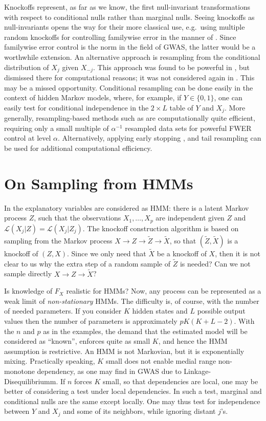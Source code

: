 \documentclass[article,lineno]{biometrika}
\begin{document}
	Knockoffs represent, as far as we know, the first null-invariant transformations with respect to conditional nulls rather than marginal nulls.
	Seeing knockoffs as null-invariants opens the way for their more classical use, e.g.\ using multiple random knockoffs for controlling familywise error in the manner of \cite{Westfall1993}. Since familywise error control is the norm in the field of GWAS, the latter would be a worthwhile extension. 
	An alternative approach is resampling from the conditional distribution of $X_j$ given $X_{-j}$. 
	This approach was found to be powerful in \cite[Fig.3]{CandesPanninggoldmodelX2018}, but dismissed there for computational reasons; it was not considered again in \cite{SesiaGenehuntinghidden}. 
	This may be a missed opportunity. 
	Conditional resampling can be done easily in the context of hidden Markov models, where, for example, if $Y\in \{0,1\}$, one can easily test for conditional independence in the $2\times L$ table of $Y$ and $X_j$. 
	More generally, resampling-based methods such as \cite{Westfall1993} are computationally quite efficient, requiring only a small multiple of $\alpha^{-1}$ resampled data sets for powerful FWER control at level $\alpha$. 
	Alternatively, applying early stopping \citep[e.g.][]{jiang2012statistical}, and tail resampling \cite[e.g.][]{yu2011efficient} can be used for additional computational efficiency.
		
	
	
	\section{On Sampling from HMMs}
	In \cite{SesiaGenehuntinghidden} the explanatory variables are considered as HMM: there is a latent Markov process $Z$, such that the observations $X_1,\dots,X_p$ are independent given $Z$ and ${\mathcal L}(X_j|Z)={\mathcal L}(X_j|Z_j)$.
	The knockoff construction algorithm is based on sampling from the Markov process $X\to Z\to \tilde Z\to \tilde X$, so that $(\tilde Z,\tilde X)$ is a knockoff of $(Z,X)$.
	Since we only need that $\tilde{X}$ be a knockoff of $X$, then it is not clear to us why the extra step of a random sample of $\tilde Z$ is needed? Can we not sample directly $X\to Z\to \tilde X$?
	
	Is knowledge of $F_X$ realistic for HMMs?
	Now, any process can be  represented as a weak limit of \emph{non-stationary} HMMs.
	The difficulty is, of course, with the number of needed parameters.
	If you consider $K$ hidden states and $L$ possible output values then the number of parameters is approximately $pK(K+L-2)$.
	With the $n$ and $p$ as in the examples, the demand that the estimated model will be considered as ``known'', enforces quite as small $K$, and hence the HMM assumption is restrictive.
	An HMM is not Markovian, but it is exponentially mixing.
	Practically speaking, $K$ small does not enable medial range non-monotone dependency, as one may find in GWAS due to Linkage-Disequilibriumm.
	If $n$ forces $K$ small, so that dependencies are local, one may be better of considering a test under local dependencies.
	In such a test, marginal and conditional nulls are the same except locally.
	One may thus test for independence between $Y$ and $X_j$ and some of its neighbors, while ignoring distant $j$'s.
	
\end{document}
